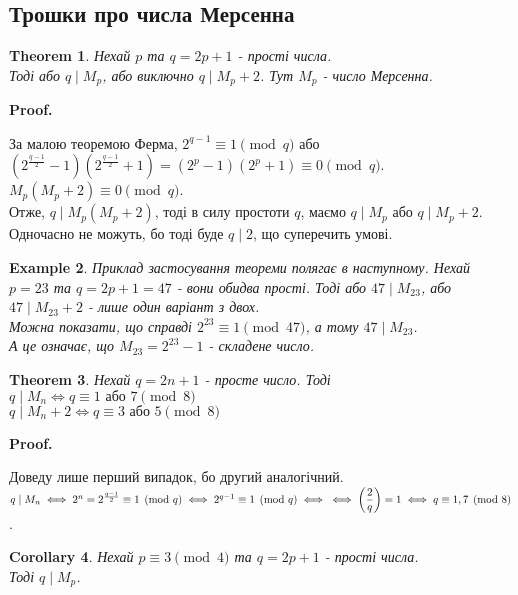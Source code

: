 \documentclass[a4paper, 14pt]{extarticle}
\makeatletter
\theoremstyle{theoremdd}
\newtheorem{theorem}{Theorem}[subsection]
\theoremstyle{theoremdd}
\theoremstyle{theoremdd}
\theoremstyle{theoremdd}
\newtheorem{example}[theorem]{Example}
\theoremstyle{theoremdd}
\theoremstyle{theoremdd}
\theoremstyle{theoremdd}
\theoremstyle{theoremdd}
\newtheorem{corollary}[theorem]{Corollary}
\def\qed{$\blacksquare$}
\renewenvironment{proof}[1][Proof.\\]{\par
\pushQED{\hfill \qed}%
\normalfont \topsep6\p@\@plus6\p@\relax
\trivlist
\item\relax
{\bfseries
#1\@addpunct{.}}\hspace\labelsep\ignorespaces
}{%
\popQED\endtrivlist\@endpefalse
}
\makeatother
\begin{document}
\subsection{Трошки про числа Мерсенна}
\begin{theorem}
Нехай $p$ та $q = 2p+1$ - прості числа.\\
Тоді або $q \mid M_p$, або виключно $q \mid M_p+2$. Тут $M_p$ - число Мерсенна.
\end{theorem}

\begin{proof}
За малою теоремою Ферма, $2^{q-1} \equiv 1 \pmod q$ або\\
$(2^{\frac{q-1}{2}}-1)(2^{\frac{q-1}{2}}+1) = (2^p-1)(2^p+1) \equiv 0 \pmod q$.\\
$M_p(M_p+2) \equiv 0 \pmod q$.\\
Отже, $q \mid M_p(M_p+2)$, тоді в силу простоти $q$, маємо $q \mid M_p$ або $q \mid M_p+2$.\\
Одночасно не можуть, бо тоді буде $q \mid 2$, що суперечить умові.
\end{proof}

\begin{example}
Приклад застосування теореми полягає в наступному. Нехай $p = 23$ та $q = 2p+1 = 47$ - вони обидва прості. Тоді або $47 \mid M_{23}$, або $47 \mid M_{23}+2$ - лише один варіант з двох.\\
Можна показати, що справді $2^{23} \equiv 1 \pmod {47}$, а тому $47 \mid M_{23}$.\\
А це означає, що $M_{23} = 2^{23} - 1$ - складене число.
\end{example}

\begin{theorem}
Нехай $q = 2n+1$ - просте число. Тоді\\
$q \mid M_n \iff q \equiv 1 \text{ або } 7 \pmod 8$\\
$q \mid M_n+2 \iff q \equiv 3 \text{ або } 5 \pmod 8$
\end{theorem}

\begin{proof}
Доведу лише перший випадок, бо другий аналогічний.\\
$q \mid M_n \iff 2^n = 2^{\frac{q-1}{2}} \equiv 1 \pmod q \iff 2^{q-1} \equiv 1 \pmod q \iff \\ \iff \left( \dfrac{2}{q} \right) = 1 \iff q \equiv 1,7 \pmod 8$.
\end{proof}

\begin{corollary}
Нехай $p \equiv 3 \pmod 4$ та $q = 2p+1$ - прості числа.\\
Тоді $q \mid M_p$.
\end{corollary}
\end{document}
